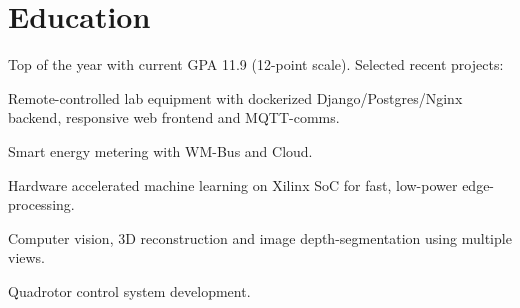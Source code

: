 \documentclass[a4paper]{janus-resume}
\begin{document}
\begin{minipage}[t]{0.49\textwidth} %


\section{Education} 

Top of the year with current GPA 11.9 (12-point scale).
Selected recent projects:
\vspace{\topsep}
\begin{tightitemize}
\item Remote-controlled lab equipment with dockerized Django/Postgres/Nginx backend, responsive web frontend and MQTT-comms.
\item Smart energy metering with WM-Bus and Cloud.
\item Hardware accelerated machine learning on Xilinx SoC for fast, low-power edge-processing.
\item Computer vision, 3D reconstruction and image depth-segmentation using multiple views.
\item Quadrotor control system development.
\end{tightitemize}

\sectionspace %


\end{minipage}
\end{document}
